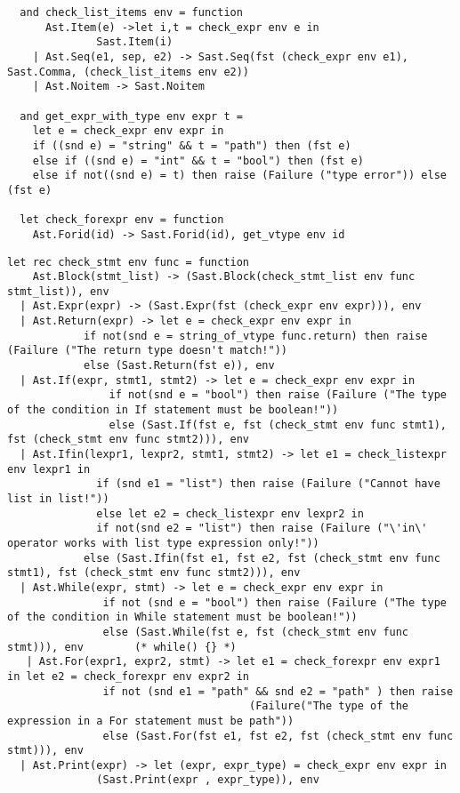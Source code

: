 \documentclass[11pt]{article}
\begin{document}
\begin{listing}[H]
\begin{verbatim}
  and check_list_items env = function
      Ast.Item(e) ->let i,t = check_expr env e in
              Sast.Item(i)
    | Ast.Seq(e1, sep, e2) -> Sast.Seq(fst (check_expr env e1), Sast.Comma, (check_list_items env e2))
    | Ast.Noitem -> Sast.Noitem

  and get_expr_with_type env expr t =
    let e = check_expr env expr in
    if ((snd e) = "string" && t = "path") then (fst e)
    else if ((snd e) = "int" && t = "bool") then (fst e)
    else if not((snd e) = t) then raise (Failure ("type error")) else (fst e)

  let check_forexpr env = function
    Ast.Forid(id) -> Sast.Forid(id), get_vtype env id
  \end{verbatim}
\end{listing}

\begin{listing}[H]
  \begin{verbatim}
let rec check_stmt env func = function
    Ast.Block(stmt_list) -> (Sast.Block(check_stmt_list env func stmt_list)), env
  | Ast.Expr(expr) -> (Sast.Expr(fst (check_expr env expr))), env
  | Ast.Return(expr) -> let e = check_expr env expr in
            if not(snd e = string_of_vtype func.return) then raise (Failure ("The return type doesn't match!"))
            else (Sast.Return(fst e)), env
  | Ast.If(expr, stmt1, stmt2) -> let e = check_expr env expr in
                if not(snd e = "bool") then raise (Failure ("The type of the condition in If statement must be boolean!"))
                else (Sast.If(fst e, fst (check_stmt env func stmt1), fst (check_stmt env func stmt2))), env
  | Ast.Ifin(lexpr1, lexpr2, stmt1, stmt2) -> let e1 = check_listexpr env lexpr1 in
              if (snd e1 = "list") then raise (Failure ("Cannot have list in list!"))
              else let e2 = check_listexpr env lexpr2 in
              if not(snd e2 = "list") then raise (Failure ("\'in\' operator works with list type expression only!"))
            else (Sast.Ifin(fst e1, fst e2, fst (check_stmt env func stmt1), fst (check_stmt env func stmt2))), env
  | Ast.While(expr, stmt) -> let e = check_expr env expr in
               if not (snd e = "bool") then raise (Failure ("The type of the condition in While statement must be boolean!"))
               else (Sast.While(fst e, fst (check_stmt env func stmt))), env        (* while() {} *)
   | Ast.For(expr1, expr2, stmt) -> let e1 = check_forexpr env expr1 in let e2 = check_forexpr env expr2 in
               if not (snd e1 = "path" && snd e2 = "path" ) then raise
                                      (Failure("The type of the expression in a For statement must be path"))
               else (Sast.For(fst e1, fst e2, fst (check_stmt env func stmt))), env
  | Ast.Print(expr) -> let (expr, expr_type) = check_expr env expr in
              (Sast.Print(expr , expr_type)), env


\end{verbatim}
\end{listing}
\end{document}
